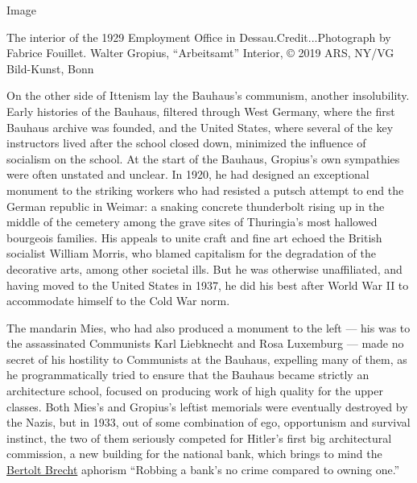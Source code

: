 Image

The interior of the 1929 Employment Office in Dessau.Credit...Photograph
by Fabrice Fouillet. Walter Gropius, ``Arbeitsamt'' Interior, © 2019
ARS, NY/VG Bild-Kunst, Bonn

On the other side of Ittenism lay the Bauhaus's communism, another
insolubility. Early histories of the Bauhaus, filtered through West
Germany, where the first Bauhaus archive was founded, and the United
States, where several of the key instructors lived after the school
closed down, minimized the influence of socialism on the school. At the
start of the Bauhaus, Gropius's own sympathies were often unstated and
unclear. In 1920, he had designed an exceptional monument to the
striking workers who had resisted a putsch attempt to end the German
republic in Weimar: a snaking concrete thunderbolt rising up in the
middle of the cemetery among the grave sites of Thuringia's most
hallowed bourgeois families. His appeals to unite craft and fine art
echoed the British socialist William Morris, who blamed capitalism for
the degradation of the decorative arts, among other societal ills. But
he was otherwise unaffiliated, and having moved to the United States in
1937, he did his best after World War II to accommodate himself to the
Cold War norm.

The mandarin Mies, who had also produced a monument to the left --- his
was to the assassinated Communists Karl Liebknecht and Rosa Luxemburg
--- made no secret of his hostility to Communists at the Bauhaus,
expelling many of them, as he programmatically tried to ensure that the
Bauhaus became strictly an architecture school, focused on producing
work of high quality for the upper classes. Both Mies's and Gropius's
leftist memorials were eventually destroyed by the Nazis, but in 1933,
out of some combination of ego, opportunism and survival instinct, the
two of them seriously competed for Hitler's first big architectural
commission, a new building for the national bank, which brings to mind
the
\href{https://www.nytimes3xbfgragh.onion/2018/12/14/books/review/bertolt-brecht-collected-poems.html}{Bertolt
Brecht} aphorism ``Robbing a bank's no crime compared to owning one.''

